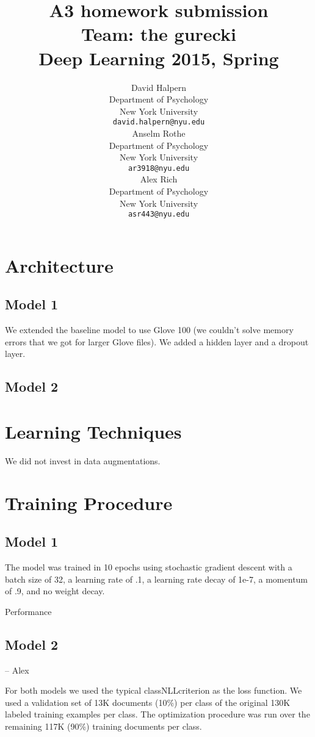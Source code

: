 \documentclass{article} %
\title{A3 homework submission \\ Team: the gurecki \\ Deep Learning 2015, Spring}
\author{
David Halpern\\
Department of Psychology\\
New York University\\
\texttt{david.halpern@nyu.edu} \\
\And
Anselm Rothe\\
Department of Psychology\\
New York University\\
\texttt{ar3918@nyu.edu} \\
\AND
Alex Rich\\
Department of Psychology\\
New York University\\
\texttt{asr443@nyu.edu} \\
}
\begin{document}
\maketitle


\section{Architecture}

\subsection{Model 1}

We extended the baseline model to use Glove 100 (we couldn't solve memory errors that we got for larger Glove files).
We added a hidden layer and a dropout layer.



\subsection{Model 2}


\section{Learning Techniques}

We did not invest in data augmentations. 

\section{Training Procedure}

\subsection{Model 1}

The model was trained in 10 epochs using stochastic gradient descent with a batch size of 32, a learning rate of .1, a learning rate decay of 1e-7, a momentum of .9, and no weight decay.

Performance

\subsection{Model 2}

-- Alex


For both models we used the typical classNLLcriterion as the loss function. We used a validation set of 13K documents (10\%) per class of the original 130K labeled training examples per class.
The optimization procedure was run over the remaining 117K (90\%) training documents per class.
\end{document}
